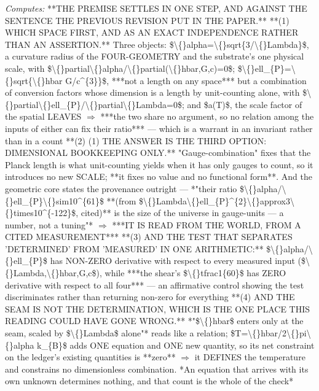 \begin{description}
\emph{Computes:} **THE PREMISE SETTLES IN ONE STEP, AND AGAINST THE SENTENCE THE PREVIOUS REVISION PUT IN THE PAPER.**  **(1)  WHICH SPACE FIRST, AND AS AN EXACT INDEPENDENCE RATHER THAN AN ASSERTION.** Three objects: \$\textbackslash\{\}alpha=\textbackslash\{\}sqrt\{3/\textbackslash\{\}Lambda\}\$, a curvature radius of the FOUR-GEOMETRY and the substrate's one physical scale, with \$\textbackslash\{\}partial\textbackslash\{\}alpha/\textbackslash\{\}partial(\textbackslash\{\}hbar,G,c)=0\$; \$\textbackslash\{\}ell\_\{P\}=\textbackslash\{\}sqrt\{\textbackslash\{\}hbar G/c\textasciicircum{}\{3\}\}\$, ***not a length on any space*** but a combination of conversion factors whose dimension is a length by unit-counting alone, with \$\textbackslash\{\}partial\textbackslash\{\}ell\_\{P\}/\textbackslash\{\}partial\textbackslash\{\}Lambda=0\$; and \$a(T)\$, the scale factor of the spatial LEAVES \ensuremath{\Rightarrow} ***the two share no argument, so no relation among the inputs of either can fix their ratio*** --- which is a warrant in an invariant rather than in a count  **(2) (1) THE ANSWER IS THE THIRD OPTION: DIMENSIONAL BOOKKEEPING ONLY.** "Gauge-combination" fixes that the Planck length is what unit-counting yields when it has only gauges to count, so it introduces no new SCALE; **it fixes no value and no functional form**. And the geometric core states the provenance outright --- *"their ratio \$\textbackslash\{\}alpha/\textbackslash\{\}ell\_\{P\}\textbackslash\{\}sim10\textasciicircum{}\{61\}\$ **(from \$\textbackslash\{\}Lambda\textbackslash\{\}ell\_\{P\}\textasciicircum{}\{2\}\textbackslash\{\}approx3\textbackslash\{\}times10\textasciicircum{}\{-122\}\$, cited)** is the size of the universe in gauge-units --- a number, not a tuning"* \ensuremath{\Rightarrow} ***IT IS READ FROM THE WORLD, FROM A CITED MEASUREMENT***  **(3) AND THE TEST THAT SEPARATES 'DETERMINED' FROM 'MEASURED' IN ONE ARITHMETIC:** \$\textbackslash\{\}alpha/\textbackslash\{\}ell\_\{P\}\$ has NON-ZERO derivative with respect to every measured input (\$\textbackslash\{\}Lambda,\textbackslash\{\}hbar,G,c\$), while ***the shear's \$\textbackslash\{\}tfrac1\{60\}\$ has ZERO derivative with respect to all four*** --- an affirmative control showing the test discriminates rather than returning non-zero for everything  **(4) AND THE SEAM IS NOT THE DETERMINATION, WHICH IS THE ONE PLACE THIS READING COULD HAVE GONE WRONG.** *"\$\textbackslash\{\}hbar\$ enters only at the seam, scaled by \$\textbackslash\{\}Lambda\$ alone"* reads like a relation; \$T=\textbackslash\{\}hbar/2\textbackslash\{\}pi\textbackslash\{\}alpha k\_\{B\}\$ adds ONE equation and ONE new quantity, so its net constraint on the ledger's existing quantities is **zero** \ensuremath{\Rightarrow} it DEFINES the temperature and constrains no dimensionless combination. *An equation that arrives with its own unknown determines nothing, and that count is the whole of the check*

\end{description}
